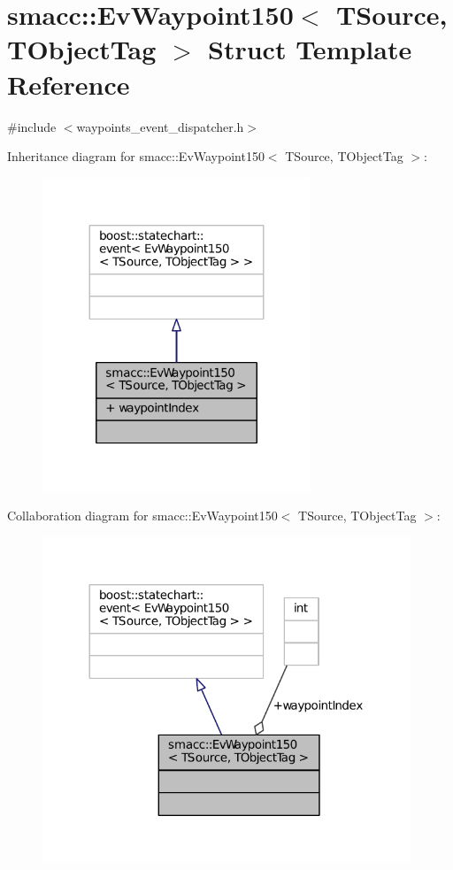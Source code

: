 \hypertarget{structsmacc_1_1EvWaypoint150}{}\section{smacc\+:\+:Ev\+Waypoint150$<$ T\+Source, T\+Object\+Tag $>$ Struct Template Reference}
\label{structsmacc_1_1EvWaypoint150}


{\ttfamily \#include $<$waypoints\+\_\+event\+\_\+dispatcher.\+h$>$}



Inheritance diagram for smacc\+:\+:Ev\+Waypoint150$<$ T\+Source, T\+Object\+Tag $>$\+:
\nopagebreak
\begin{figure}[H]
\begin{center}
\leavevmode
\includegraphics[width=227pt]{structsmacc_1_1EvWaypoint150__inherit__graph}
\end{center}
\end{figure}


Collaboration diagram for smacc\+:\+:Ev\+Waypoint150$<$ T\+Source, T\+Object\+Tag $>$\+:
\nopagebreak
\begin{figure}[H]
\begin{center}
\leavevmode
\includegraphics[width=312pt]{structsmacc_1_1EvWaypoint150__coll__graph}
\end{center}
\end{figure}
